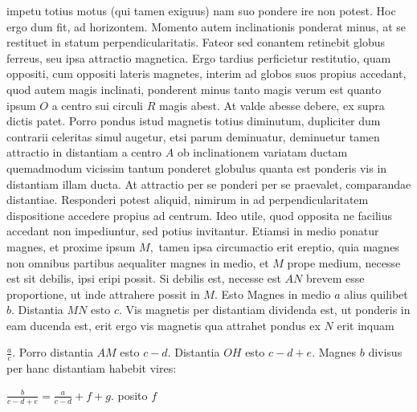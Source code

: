 impetu\protect{} totius motus (qui tamen exiguus) nam suo pondere\protect{} ire non potest. Hoc ergo dum fit,  ad horizontem. Momento autem inclinationis ponderat minus, at se restituet in statum perpendicularitatis. Fateor sed conantem retinebit globus\protect{} ferreus, seu ipsa attractio magnetica\protect{}. Ergo tardius perficietur restitutio, quam oppositi, cum oppositi lateris magnetes, interim ad globos suos propius accedant, quod autem magis inclinati, ponderent minus tanto magis verum est quanto ipsum $O$ a centro sui circuli $R$
magis abest. At valde abesse debere, ex supra dictis patet. 
\pend 
\pstart
Porro pondus\protect{} istud magnetis totius diminutum, dupliciter dum contrarii celeritas\protect{} simul augetur, etsi parum deminuatur, deminuetur tamen 
 attractio\protect{} in distantiam a centro $A$ ob inclinationem variatam ductam quemadmodum vicissim tantum ponderet globulus quanta est ponderis vis\protect{} in distantiam illam ducta. At attractio per se ponderi\protect{} per se praevalet, comparandae distantiae. Responderi potest aliquid, nimirum in  ad perpendicularitatem dispositione accedere propius ad centrum. Ideo utile, quod opposita ne facilius accedant non impediuntur, sed potius invitantur. 
\pend 
\pstart
Etiamsi in medio ponatur magnes\protect{}, et proxime ipsum $M,$ tamen ipsa circumactio erit ereptio, quia magnes non omnibus partibus aequaliter 
 magnes\protect{} in medio, et $M$ prope medium, necesse est sit debilis,  ipsi eripi possit. Si debilis est, necesse est $AN$ brevem esse proportione, ut inde attrahere possit in $M.$ Esto Magnes\protect{} in medio $a$ alius quilibet $b.$ Distantia $MN$ esto $c.$ Vis magnetis per distantiam dividenda est, ut ponderis\protect{} in eam ducenda est, erit ergo vis magnetis qua attrahet pondus\protect{} ex $N$ erit inquam \rule[-4mm]{0mm}{10mm}$ \displaystyle \frac{a}{c}$. Porro distantia $AM$  esto $ \displaystyle c-d.$ Distantia $OH$ esto $ \displaystyle c-d+e.$ Magnes\protect{} $b$ divisus per hanc distantiam habebit vires: \rule[-4mm]{0mm}{10mm}$ \displaystyle \frac{b}{c-d+e}=\frac{a}{c-d}+f+g.$ posito $f$
